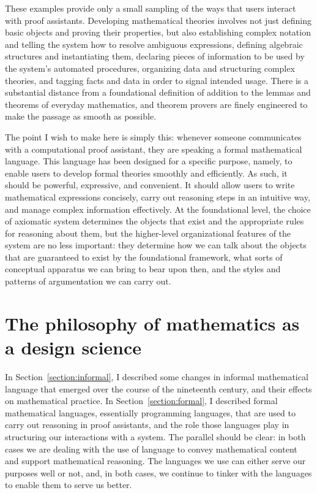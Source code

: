 \documentclass[12pt]{article}
\begin{document}
These examples provide only a small sampling of the ways that users interact with proof assistants. Developing mathematical theories involves not just defining basic objects and proving their properties, but also establishing complex notation and telling the system how to resolve ambiguous expressions, defining algebraic structures and instantiating them, declaring pieces of information to be used by the system's automated procedures, organizing data and structuring complex theories, and tagging facts and data in order to signal intended usage. There is a substantial distance from a foundational definition of addition to the lemmas and theorems of everyday mathematics, and theorem provers are finely engineered to make the passage as smooth as possible.

The point I wish to make here is simply this: whenever someone communicates with a computational proof assistant, they are speaking a formal mathematical language. This language has been designed for a specific purpose, namely, to enable users to develop formal theories smoothly and efficiently. As such, it should be powerful, expressive, and convenient. It should allow users to write mathematical expressions concisely, carry out reasoning steps in an intuitive way, and manage complex information effectively. At the foundational level, the choice of axiomatic system determines the objects that exist and the appropriate rules for reasoning about them, but the higher-level organizational features of the system are no less important: they determine how we can talk about the objects that are guaranteed to exist by the foundational framework, what sorts of conceptual apparatus we can bring to bear upon then, and the styles and patterns of argumentation we can carry out.

\section{The philosophy of mathematics as a design science}
\label{section:philosophy}

In Section~\ref{section:informal}, I described some changes in informal mathematical language that emerged over the course of the nineteenth century, and their effects on mathematical practice. In Section~\ref{section:formal}, I described formal mathematical languages, essentially programming languages, that are used to carry out reasoning in proof assistants, and the role those languages play in structuring our interactions with a system. The parallel should be clear: in both cases we are dealing with the use of language to convey mathematical content and support mathematical reasoning. The languages we use can either serve our purposes well or not, and, in both cases, we continue to tinker with the languages to enable them to serve us better.
\end{document}

